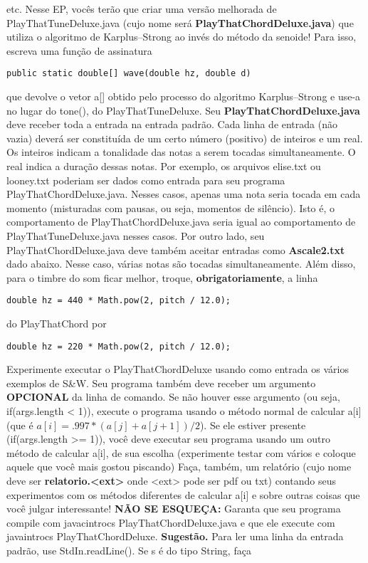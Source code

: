 \documentclass{article}
\begin{document}
etc.
\bigbreak
Nesse EP, voc\^es ter\~ao
que criar uma vers\~ao melhorada de
PlayThatTuneDeluxe.java (cujo nome ser\'a \textbf{PlayThatChordDeluxe.java}) que utiliza o algoritmo de Karplus--Strong ao inv\'es do m\'etodo da senoide!  Para isso, escreva uma fun\c{c}\~ao de assinatura
\bigbreak
\begin{lstlisting}[breaklines, gobble=8]
	public static double[] wave(double hz, double d)
\end{lstlisting}

que devolve o vetor a[] obtido pelo processo do algoritmo Karplus--Strong e use-a no lugar do tone(), do PlayThatTuneDeluxe.
\bigbreak
Seu \textbf{PlayThatChordDeluxe.java} deve receber toda a entrada na entrada padr\~ao. Cada linha de entrada (n\~ao vazia) dever\'a ser constitu\'ida de um certo n\'umero (positivo) de inteiros e um real. Os inteiros indicam a tonalidade das notas a serem tocadas simultaneamente. O real indica a dura\c{c}\~ao dessas notas.
\bigbreak
Por exemplo, os arquivos elise.txt ou looney.txt poderiam ser dados como entrada para seu programa PlayThatChordDeluxe.java. Nesses casos, apenas uma nota seria tocada em cada momento (misturadas com pausas, ou seja, momentos de sil\^encio). Isto \'e, o comportamento de PlayThatChordDeluxe.java seria igual ao comportamento de PlayThatTuneDeluxe.java nesses casos.
\bigbreak
Por outro lado, seu PlayThatChordDeluxe.java deve tamb\'em aceitar entradas como \textbf{Ascale2.txt} dado abaixo. Nesse caso, v\'arias notas s\~ao tocadas simultaneamente.
\bigbreak
Al\'em disso, para o timbre do som ficar melhor, troque, \textbf{obrigatoriamente}, a linha

\begin{lstlisting}[breaklines, gobble=8]
	double hz = 440 * Math.pow(2, pitch / 12.0);
\end{lstlisting}

do PlayThatChord por

\begin{lstlisting}[breaklines, gobble=8]
	double hz = 220 * Math.pow(2, pitch / 12.0);
\end{lstlisting}
\bigbreak
Experimente executar o PlayThatChordDeluxe usando como entrada
os v\'arios exemplos de S\&W.
\bigbreak
Seu programa tamb\'em deve receber um argumento \textbf{OPCIONAL} da linha de comando. Se n\~ao houver esse argumento (ou seja, if(args.length < 1)), execute o programa usando o m\'etodo normal de calcular a[i] (que \'e $a[i] = .997*(a[j] + a[j+1])/2$). Se ele estiver presente (if(args.length >= 1)), voc\^e deve executar seu programa usando um outro m\'etodo de calcular a[i], de sua escolha (experimente testar com v\'arios e coloque aquele que voc\^e mais gostou piscando)
\bigbreak
Fa\c{c}a, tamb\'em, um relat\'orio (cujo nome deve ser \textbf{relatorio.<ext>} onde <ext> pode ser pdf ou txt) contando seus experimentos com os m\'etodos diferentes de calcular a[i] e sobre outras coisas que voc\^e julgar interessante!
\bigbreak
\textbf{N\~AO SE ESQUE\c{C}A:} Garanta que seu programa compile com javac\-introcs PlayThatChordDeluxe.java e que ele execute com java\-introcs PlayThatChordDeluxe.
\bigbreak
\textbf{Sugest\~ao.} Para ler uma linha da entrada padr\~ao, use StdIn.readLine(). Se s \'e do tipo String, fa\c{c}a
\end{document}
